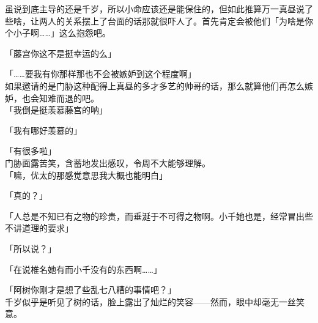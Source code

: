 虽说到底主导的还是千岁，所以小命应该还是能保住的，但如此推算万一真昼说了些啥，让两人的关系摆上了台面的话那就很吓人了。首先肯定会被他们「为啥是你个小子啊……」这么抱怨吧。

「藤宫你这不是挺幸运的么」

「……要我有你那样那也不会被嫉妒到这个程度啊」\\

如果邀请的是门胁这种配得上真昼的多才多艺的帅哥的话，那么就算他们再怎么嫉妒，也会知难而退的吧。\\

「我倒是挺羡慕藤宫的呐」

「我有哪好羡慕的」

「有很多啦」\\

门胁面露苦笑，含蓄地发出感叹，令周不大能够理解。\\

「嘛，优太的那感觉意思我大概也能明白」

「真的？」

「人总是不知已有之物的珍贵，而垂涎于不可得之物啊。小千她也是，经常冒出些不讲道理的要求」

「所以说？」

「在说椎名她有而小千没有的东西啊……」

「阿树你刚才是想了些乱七八糟的事情吧？」\\

千岁似乎是听见了树的话，脸上露出了灿烂的笑容——然而，眼中却毫无一丝笑意。\\

